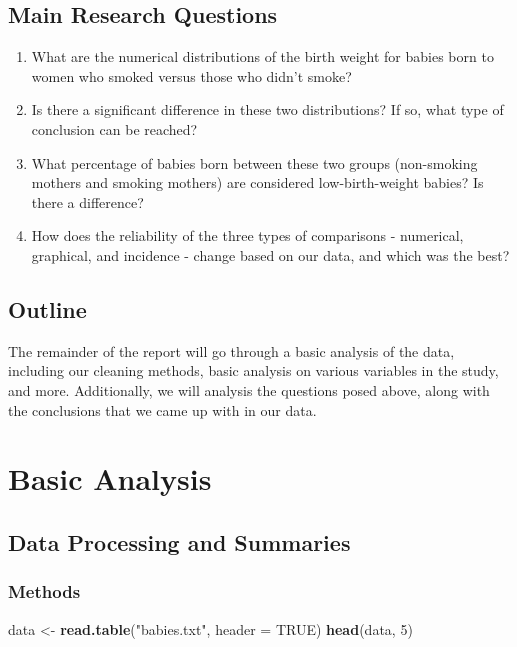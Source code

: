 \documentclass[
]{article}
\newenvironment{Shaded}{\begin{snugshade}}{\end{snugshade}}
\newcommand{\AttributeTok}[1]{\textcolor[rgb]{0.13,0.29,0.53}{#1}}
\newcommand{\ConstantTok}[1]{\textcolor[rgb]{0.56,0.35,0.01}{#1}}
\newcommand{\DecValTok}[1]{\textcolor[rgb]{0.00,0.00,0.81}{#1}}
\newcommand{\FunctionTok}[1]{\textcolor[rgb]{0.13,0.29,0.53}{\textbf{#1}}}
\newcommand{\NormalTok}[1]{#1}
\newcommand{\OtherTok}[1]{\textcolor[rgb]{0.56,0.35,0.01}{#1}}
\newcommand{\StringTok}[1]{\textcolor[rgb]{0.31,0.60,0.02}{#1}}
\providecommand{\tightlist}{%
  \setlength{\itemsep}{0pt}\setlength{\parskip}{0pt}}
\begin{document}
\subsection{Main Research Questions}\label{main-research-questions}

\begin{enumerate}
\def\labelenumi{\arabic{enumi}.}
\tightlist
\item
  What are the numerical distributions of the birth weight for babies
  born to women who smoked versus those who didn't smoke?
\item
  Is there a significant difference in these two distributions? If so,
  what type of conclusion can be reached?
\item
  What percentage of babies born between these two groups (non-smoking
  mothers and smoking mothers) are considered low-birth-weight babies?
  Is there a difference?
\item
  How does the reliability of the three types of comparisons -
  numerical, graphical, and incidence - change based on our data, and
  which was the best?
\end{enumerate}

\subsection{Outline}\label{outline}

The remainder of the report will go through a basic analysis of the
data, including our cleaning methods, basic analysis on various
variables in the study, and more. Additionally, we will analysis the
questions posed above, along with the conclusions that we came up with
in our data.

\section{Basic Analysis}\label{basic-analysis}

\subsection{Data Processing and
Summaries}\label{data-processing-and-summaries}

\subsubsection{Methods}\label{methods}

\begin{Shaded}
\begin{Highlighting}[]
\NormalTok{data }\OtherTok{\textless{}{-}} \FunctionTok{read.table}\NormalTok{(}\StringTok{"babies.txt"}\NormalTok{, }\AttributeTok{header =} \ConstantTok{TRUE}\NormalTok{)}
\FunctionTok{head}\NormalTok{(data, }\DecValTok{5}\NormalTok{)}
\end{Highlighting}
\end{Shaded}
\end{document}
